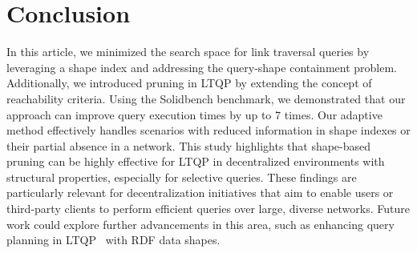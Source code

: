\section{Conclusion}

In this article, we minimized the search space for link traversal queries by leveraging a shape index and addressing the query-shape containment problem.
Additionally, we introduced pruning in LTQP by extending the concept of reachability criteria.
Using the Solidbench benchmark, we demonstrated that our approach can improve query execution times by up to 7 times.
Our adaptive method effectively handles scenarios with reduced information in shape indexes or their partial absence in a network.
This study highlights that shape-based pruning can be highly effective for LTQP in decentralized environments with structural properties, especially for selective queries.
These findings are particularly relevant for decentralization initiatives that aim to enable users or third-party clients to perform efficient queries over large, diverse networks.
Future work could explore further advancements in this area, such as enhancing query planning in LTQP~\cite{taelman2024towards} with RDF data shapes.
